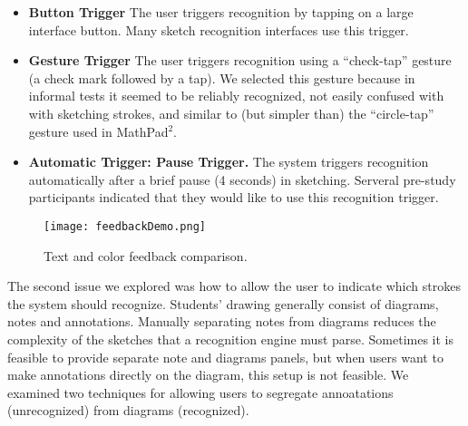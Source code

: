 \documentclass{egpubl}
\begin{document}
\begin{itemize}
\item \textbf{Button Trigger}  The user triggers
recognition by tapping on a large interface button.  Many sketch
recognition interfaces use this trigger.
\item \textbf{Gesture Trigger}  The user triggers
recognition using a ``check-tap'' gesture (a
check mark followed by a tap).  We
selected this gesture because in informal tests it seemed to be
reliably recognized, not easily confused with with sketching strokes,
and similar to (but simpler than) the ``circle-tap'' gesture used in
MathPad$^2$.  
\item \textbf{Automatic Trigger: Pause Trigger.}  The system triggers
recognition automatically after a brief pause (4 seconds) in
sketching.  Serveral pre-study participants indicated that they would
like to use this recognition trigger.
\end{itemize}





\begin{figure}[tb]
  \centering
  \texttt{[image: feedbackDemo.png]}
  \caption{\label{fig:feedbackDemo}
           Text and color feedback comparison.}
\end{figure}


The second issue we explored was how to allow the user to indicate
which strokes the system should recognize.  Students' drawing
generally consist of diagrams, notes and annotations.  Manually
separating notes from diagrams reduces the complexity of the sketches
that a recognition engine must parse.  Sometimes it is feasible to
provide separate note and diagrams panels, but when users want to make
annotations directly on the diagram, this setup is not feasible.  We
examined two techniques for allowing users to segregate annoatations
(unrecognized) from diagrams (recognized).
\end{document}
